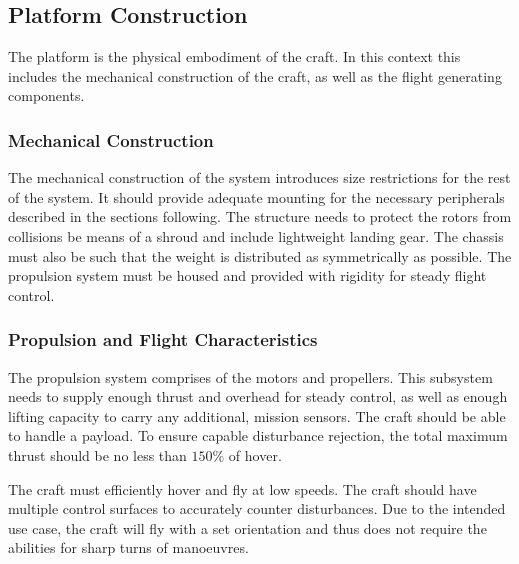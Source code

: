 		\subsection{Platform Construction}
		The platform is the physical embodiment of the craft. In this context this includes the mechanical construction of the craft, as well as the flight generating components.
		
			\subsubsection{Mechanical Construction}
			The mechanical construction of the system introduces size restrictions for the rest of the system. It should provide adequate mounting for the necessary peripherals described in the sections following. The structure needs to protect the rotors from collisions be means of a shroud and include lightweight landing gear. The chassis must also be such that the weight is distributed as symmetrically as possible. The propulsion system must be housed and provided with rigidity for steady flight control.

			\subsubsection{Propulsion and Flight Characteristics}
			The propulsion system comprises of the motors and propellers. This subsystem needs to supply enough thrust and overhead for steady control, as well as enough lifting capacity to carry any additional, mission sensors. The craft should be able to handle a \payLoadMass payload. To ensure capable disturbance rejection, the total maximum thrust should be no less than $150\%$ of hover.
			
			The craft must efficiently hover and fly at low speeds. The craft should have multiple control surfaces to accurately counter disturbances. Due to the intended use case, the craft will fly with a set orientation and thus does not require the abilities for sharp turns of manoeuvres.
		

